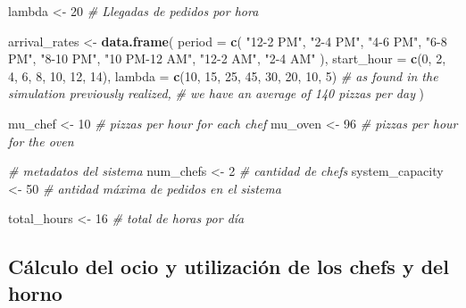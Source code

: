 \documentclass[
]{article}
\newenvironment{Shaded}{\begin{snugshade}}{\end{snugshade}}
\newcommand{\AttributeTok}[1]{\textcolor[rgb]{0.13,0.29,0.53}{#1}}
\newcommand{\CommentTok}[1]{\textcolor[rgb]{0.56,0.35,0.01}{\textit{#1}}}
\newcommand{\DecValTok}[1]{\textcolor[rgb]{0.00,0.00,0.81}{#1}}
\newcommand{\FunctionTok}[1]{\textcolor[rgb]{0.13,0.29,0.53}{\textbf{#1}}}
\newcommand{\NormalTok}[1]{#1}
\newcommand{\OtherTok}[1]{\textcolor[rgb]{0.56,0.35,0.01}{#1}}
\newcommand{\StringTok}[1]{\textcolor[rgb]{0.31,0.60,0.02}{#1}}
\begin{document}
\begin{Shaded}
\begin{Highlighting}[]
\NormalTok{lambda }\OtherTok{\textless{}{-}} \DecValTok{20}  \CommentTok{\# Llegadas de pedidos por hora}

\NormalTok{arrival\_rates }\OtherTok{\textless{}{-}} \FunctionTok{data.frame}\NormalTok{(}
  \AttributeTok{period =} \FunctionTok{c}\NormalTok{(}
    \StringTok{"12{-}2 PM"}\NormalTok{,}
    \StringTok{"2{-}4 PM"}\NormalTok{,}
    \StringTok{"4{-}6 PM"}\NormalTok{,}
    \StringTok{"6{-}8 PM"}\NormalTok{,}
    \StringTok{"8{-}10 PM"}\NormalTok{,}
    \StringTok{"10 PM{-}12 AM"}\NormalTok{,}
    \StringTok{"12{-}2 AM"}\NormalTok{,}
    \StringTok{"2{-}4 AM"}
\NormalTok{  ),}
  \AttributeTok{start\_hour =} \FunctionTok{c}\NormalTok{(}\DecValTok{0}\NormalTok{, }\DecValTok{2}\NormalTok{, }\DecValTok{4}\NormalTok{, }\DecValTok{6}\NormalTok{, }\DecValTok{8}\NormalTok{, }\DecValTok{10}\NormalTok{, }\DecValTok{12}\NormalTok{, }\DecValTok{14}\NormalTok{),}
  \AttributeTok{lambda =} \FunctionTok{c}\NormalTok{(}\DecValTok{10}\NormalTok{, }\DecValTok{15}\NormalTok{, }\DecValTok{25}\NormalTok{, }\DecValTok{45}\NormalTok{, }\DecValTok{30}\NormalTok{, }\DecValTok{20}\NormalTok{, }\DecValTok{10}\NormalTok{, }\DecValTok{5}\NormalTok{)}
  \CommentTok{\# as found in the simulation previously realized,}
  \CommentTok{\# we have an average of 140 pizzas per day}
\NormalTok{)}

\NormalTok{mu\_chef }\OtherTok{\textless{}{-}} \DecValTok{10}   \CommentTok{\# pizzas per hour for each chef}
\NormalTok{mu\_oven }\OtherTok{\textless{}{-}} \DecValTok{96}   \CommentTok{\# pizzas per hour for the oven}

\CommentTok{\# metadatos del sistema}
\NormalTok{num\_chefs }\OtherTok{\textless{}{-}} \DecValTok{2}  \CommentTok{\# cantidad de chefs}
\NormalTok{system\_capacity }\OtherTok{\textless{}{-}} \DecValTok{50}  \CommentTok{\# antidad máxima de pedidos en el sistema}

\NormalTok{total\_hours }\OtherTok{\textless{}{-}} \DecValTok{16}  \CommentTok{\# total de horas por día}
\end{Highlighting}
\end{Shaded}

\subsection{Cálculo del ocio y utilización de los chefs y del
horno}\label{cuxe1lculo-del-ocio-y-utilizaciuxf3n-de-los-chefs-y-del-horno}
\end{document}
